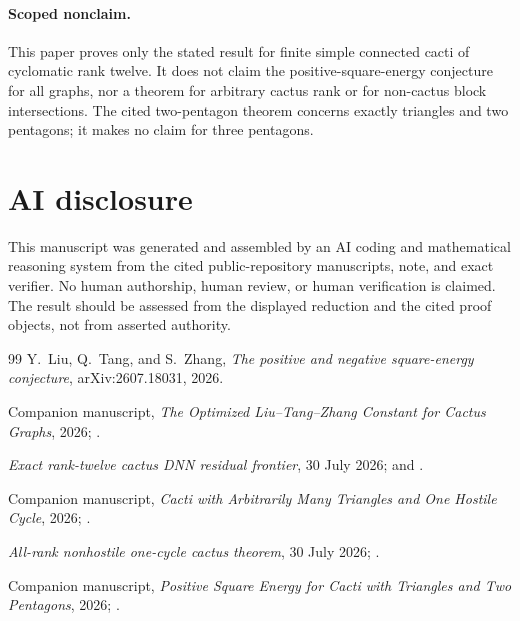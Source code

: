 \documentclass[11pt]{article}
\begin{document}
\paragraph{Scoped nonclaim.}
This paper proves only the stated result for finite simple connected cacti of
cyclomatic rank twelve.  It does not claim the positive-square-energy
conjecture for all graphs, nor a theorem for arbitrary cactus rank or for
non-cactus block intersections.  The cited two-pentagon theorem concerns
exactly triangles and two pentagons; it makes no claim for three pentagons.

\section*{AI disclosure}
This manuscript was generated and assembled by an AI coding and mathematical
reasoning system from the cited public-repository manuscripts, note, and exact
verifier.  No human authorship, human review, or human verification is claimed.
The result should be assessed from the displayed reduction and the cited proof
objects, not from asserted authority.

\begin{thebibliography}{99}
 Y.~Liu, Q.~Tang, and S.~Zhang,
\emph{The positive and negative square-energy conjecture}, arXiv:2607.18031,
2026.

 Companion manuscript, \emph{The Optimized Liu--Tang--Zhang
Constant for Cactus Graphs}, 2026; .

 \emph{Exact rank-twelve cactus DNN residual frontier},
30 July 2026; 
and .

 Companion manuscript, \emph{Cacti with Arbitrarily Many
Triangles and One Hostile Cycle}, 2026;
.

 \emph{All-rank nonhostile one-cycle cactus theorem},
30 July 2026;
.

 Companion manuscript, \emph{Positive Square Energy for Cacti
with Triangles and Two Pentagons}, 2026;
.
\end{thebibliography}
\end{document}
